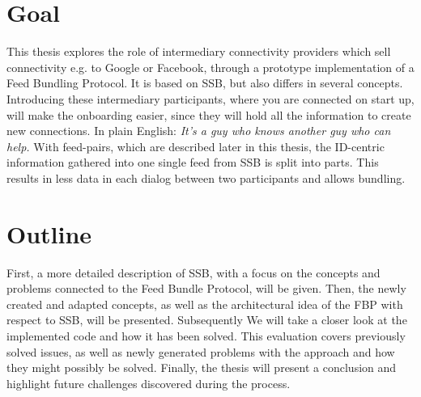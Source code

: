 \section{Goal}
This thesis explores the role of intermediary connectivity providers which sell connectivity e.g. to Google or Facebook, through a prototype implementation of a Feed Bundling Protocol. It is based on SSB, but also differs in several concepts. Introducing these intermediary participants, where you are connected on start up, will make the onboarding easier, since they will hold all the information to create new connections. In plain English: \textit{It’s a guy who knows another guy who can help.} With feed-pairs, which are described later in this thesis, the ID-centric information gathered into one single feed from SSB is split into parts. This results in less data in each dialog between two participants and allows bundling. 

\section{Outline}
First, a more detailed description of SSB, with a focus on the concepts and problems connected to the Feed Bundle Protocol, will be given. Then, the newly created and adapted concepts, as well as the architectural idea of the FBP with respect to SSB, will be presented. Subsequently We will take a closer look at the implemented code and how it has been solved. This evaluation covers previously solved issues, as well as newly generated problems with the approach and how they might possibly be solved. Finally, the thesis will present a conclusion and highlight future challenges discovered during the process. 

